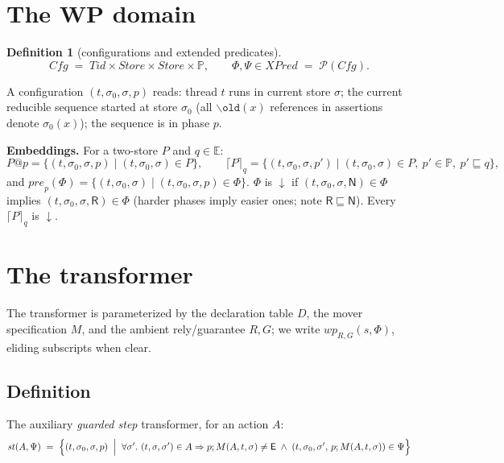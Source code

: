 \documentclass[11pt]{article}
\theoremstyle{plain}
\theoremstyle{plain}
\theoremstyle{definition}
\newtheorem{definition}{Definition}
\newcommand{\Tid}{\mathit{Tid}}
\newcommand{\Store}{\mathit{Store}}
\newcommand{\Effect}{\mathbb{E}}
\newcommand{\Phase}{\mathbb{P}}
\newcommand{\Cfg}{\mathit{Cfg}}
\newcommand{\XPred}{\mathit{XPred}}
\newcommand{\MR}{\mathsf{R}}
\newcommand{\MN}{\mathsf{N}}
\newcommand{\ME}{\mathsf{E}}
\newcommand{\sq}{\sqsubseteq}
\newcommand{\wpx}{\mathit{wp}}
\newcommand{\stp}{\mathit{st}}
\newcommand{\prep}{\mathit{pre}}
\newcommand{\upemb}[2]{\lceil #1\rceil_{#2}}     %
\newcommand{\dcl}{\ensuremath{\downarrow}\text{-closed}}
\newcommand{\oldx}[1]{\mathtt{\backslash old}(#1)}
\begin{document}
\section{The WP domain}\label{sec:domain}

\begin{definition}[configurations and extended predicates]\label{def:cfg}
\[
\Cfg \;=\; \Tid\times\Store\times\Store\times\Phase,
\qquad
\Phi,\Psi \in \XPred \;=\; \mathcal{P}(\Cfg).
\]
\end{definition}

A configuration $(t,\sigma_0,\sigma,p)$ reads: thread $t$ runs in current store
$\sigma$; the current reducible sequence started at store $\sigma_0$ (all
$\oldx{x}$ references in assertions denote $\sigma_0(x)$); the sequence is in
phase $p$.

\medskip\noindent\textbf{Embeddings.} For a two-store $P$ and $q\in\Effect$:
\[
P@p = \{(t,\sigma_0,\sigma,p) \mid (t,\sigma_0,\sigma)\in P\},
\qquad
\upemb{P}{q} = \{(t,\sigma_0,\sigma,p') \mid (t,\sigma_0,\sigma)\in P,\ p'\in\Phase,\ p'\sq q\},
\]
and $\prep_p(\Phi) = \{(t,\sigma_0,\sigma)\mid(t,\sigma_0,\sigma,p)\in\Phi\}$.
$\Phi$ is \textbf{\dcl} if $(t,\sigma_0,\sigma,\MN)\in\Phi$ implies
$(t,\sigma_0,\sigma,\MR)\in\Phi$ (harder phases imply easier ones; note
$\MR\sq\MN$). Every $\upemb{P}{q}$ is \dcl.

\section{The transformer}\label{sec:transformer}

The transformer is parameterized by the declaration table $D$, the mover
specification $M$, and the ambient rely/guarantee $R,G$; we write
$\wpx_{R,G}(s,\Phi)$, eliding subscripts when clear.

\subsection{Definition}

The auxiliary \emph{guarded step} transformer, for an action $A$:
\[
\stp(A,\Psi) \;=\;
\Bigl\{(t,\sigma_0,\sigma,p) \;\Bigm|\;
\forall\sigma'.\ (t,\sigma,\sigma')\in A \Rightarrow
p;M(A,t,\sigma)\neq\ME \;\wedge\;
(t,\sigma_0,\sigma',\,p;M(A,t,\sigma))\in\Psi \Bigr\}
\]
\end{document}
